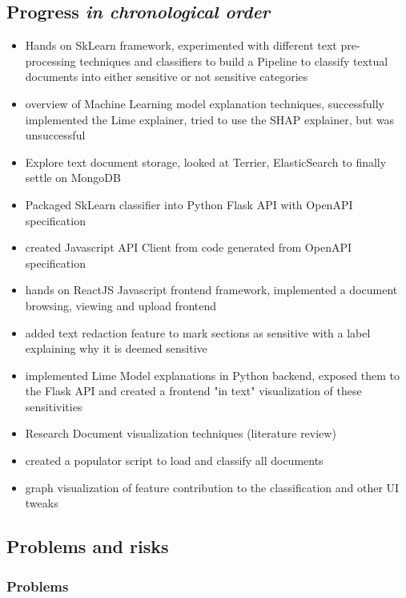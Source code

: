 \documentclass[11pt,a4paper,british]{article}
\begin{document}
\subsection{Progress \emph{in chronological order}
}\label{progress}

\begin{itemize}
    \item Hands on SkLearn framework, experimented with different text pre-processing techniques and classifiers to build a Pipeline to classify textual documents into either sensitive or not sensitive categories
    \item overview of Machine Learning model explanation techniques, successfully implemented the Lime explainer, tried to use the SHAP explainer, but was unsuccessful
    \item Explore text document storage, looked at Terrier, ElasticSearch to finally settle on MongoDB
    \item Packaged SkLearn classifier into Python Flask API with OpenAPI specification
    \item created Javascript API Client from code generated from OpenAPI specification
    \item hands on ReactJS Javascript frontend framework, implemented a document browsing, viewing and upload frontend
    \item added text redaction feature to mark sections as sensitive with a label explaining why it is deemed sensitive
    \item implemented Lime Model explanations in Python backend, exposed them to the Flask API and created a frontend "in text" visualization of these sensitivities
    \item Research Document visualization techniques (literature review)
    \item created a populator script to load and classify all documents
    \item graph visualization of feature contribution to the classification and other UI tweaks
\end{itemize}

\subsection{Problems and risks}\label{problems-and-risks}

\subsubsection{Problems}\label{problems}
\end{document}
